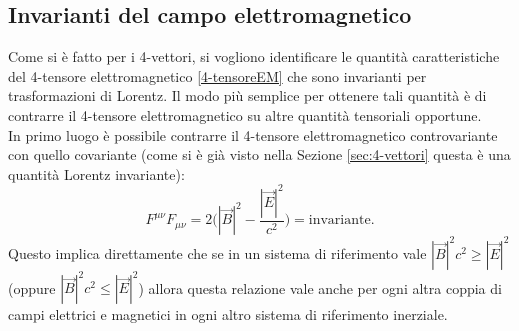 \subsection{Invarianti del campo elettromagnetico}\label{sec:invariantiEM}
Come si è fatto per i 4-vettori, si vogliono identificare le quantità caratteristiche del 4-tensore elettromagnetico \eqref{4-tensoreEM} che sono invarianti per trasformazioni di Lorentz. Il modo più semplice per ottenere tali quantità è di contrarre il 4-tensore elettromagnetico su altre quantità tensoriali opportune.\\

In primo luogo è possibile contrarre il 4-tensore elettromagnetico controvariante con quello covariante (come si è già visto nella Sezione \ref{sec:4-vettori} questa è una quantità Lorentz invariante):
\begin{equation}
    F^{\mu\nu}F_{\mu\nu}=2\biggl(|\vec B|^2-\frac{|\vec E|^2}{c^2}\biggr)=\text{invariante}.
\end{equation}
Questo implica direttamente che se in un sistema di riferimento vale $|\vec B|^2c^2\geq|\vec E|^2$ (oppure $|\vec B|^2c^2\leq|\vec E|^2$) allora questa relazione vale anche per ogni altra coppia di campi elettrici e magnetici in ogni altro sistema di riferimento inerziale.\\

